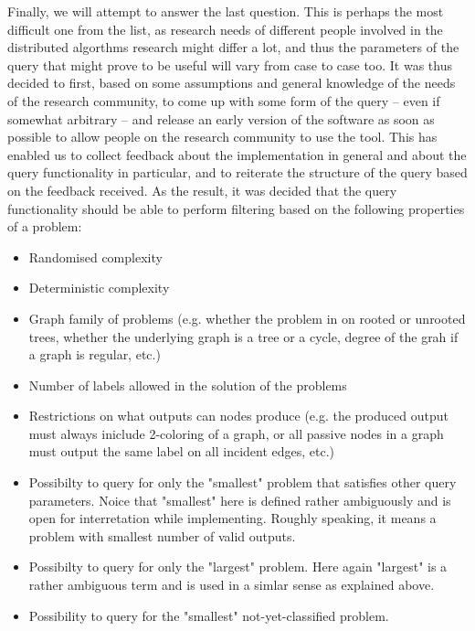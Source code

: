 Finally, we will attempt to answer the last question.
This is perhaps the most difficult one from the list,
as research needs of different people involved in 
the distributed algorthms research might differ a lot, and thus
the parameters of the query that might prove to be useful
will vary from case to case too. It was thus decided to first,
based on some assumptions and general knowledge of the
needs of the research community, to come up with some form of the
query -- even if somewhat arbitrary -- and release an early version
of the software as soon as possible to allow people on the
research community to use the tool. This has enabled us to
collect feedback about the implementation in general and about the
query functionality in particular, and to reiterate the structure of
the query based on the feedback received. As the result, it was
decided that the query functionality should be able to perform
filtering based on the following properties of a problem:

\begin{itemize}
  \item Randomised complexity
  \item Deterministic complexity
  \item Graph family of problems (e.g. whether the problem in on
  rooted or unrooted trees, whether the underlying graph is a tree
  or a cycle, degree of the grah if a graph is regular, etc.)
  \item Number of labels allowed in the solution of the problems
  \item Restrictions on what outputs can nodes produce (e.g. the
  produced output must always iniclude 2-coloring of a graph,
  or all passive nodes in a graph must output the same
  label on all incident edges, etc.)
  \item Possibilty to query for only the "smallest" problem that
  satisfies other query parameters. Noice that "smallest" here is
  defined rather ambiguously and is open for interretation while implementing. Roughly speaking, it means a problem with smallest
  number of valid outputs.
  \item Possibilty to query for only the "largest" problem. Here again
  "largest" is a rather ambiguous term and is used in a simlar sense
  as explained above.
  \item Possibility to query for the "smallest" not-yet-classified problem.
\end{itemize}
